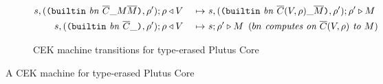 \documentclass[../plutus-core-specification.tex]{subfiles}
\begin{document}
\begin{figure}[H]
\begin{subfigure}[c]{\linewidth}
\begin{minipage}{\linewidth}
\begin{alignat*}{2}
  s,(\texttt{(} \texttt{builtin} ~ \mathit{bn} ~ \overline{C} \_ M \overline{M} \texttt{)}, \rho^{\prime});\rho & \triangleleft V
                                                 &~\mapsto~& s,(\texttt{(} \texttt{builtin} ~ \mathit{bn} ~ \overline{C}(V,\rho) \_ \overline{M} \texttt{)}, \rho^{\prime});\rho^{\prime}
                                                 \triangleright M\\
  s,(\texttt{(} \texttt{builtin} ~ \mathit{bn} ~ \overline{C} \_  \texttt{)}, \rho^{\prime});\rho & \triangleleft V
                                                 &~\mapsto~&  s;\rho^{\prime} \triangleright M
                                                 \enspace (\textit{$bn$ computes on $\overline{C}(V,\rho)$ to $M$})\\
    \end{alignat*}
\end{minipage}
    \caption{CEK machine transitions for type-erased Plutus Core}
    \label{fig:untyped-cek-transitions}
\end{subfigure}
\caption{A CEK machine for type-erased Plutus Core}
\label{fig:untyped-cek-machine}
\end{figure}

\end{document}
